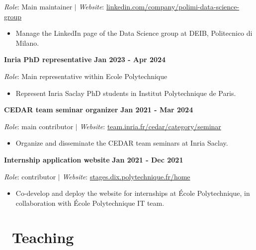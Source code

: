 \documentclass{article}
\begin{document}
\noindent\textit{Role}: Main maintainer $|$ \textit{Website}: \href{https://linkedin.com/company/polimi-data-science-group}{linkedin.com/company/polimi-data-science-group}

\begin{itemize}
\item Manage the LinkedIn page of the Data Science group at DEIB, Politecnico di Milano.
\end{itemize}
\vspace{1em}\noindent\textbf{Inria PhD representative} \hfill \textbf{Jan 2023 - Apr 2024}


\noindent\textit{Role}: Main representative within Ecole Polytechnique

\begin{itemize}
\item Represent Inria Saclay PhD students in Institut Polytechnique de Paris.
\end{itemize}
\vspace{1em}\noindent\textbf{CEDAR team seminar organizer} \hfill \textbf{Jan 2021 - Mar 2024}


\noindent\textit{Role}: main contributor $|$ \textit{Website}: \href{https://team.inria.fr/cedar/category/seminar}{team.inria.fr/cedar/category/seminar}

\begin{itemize}
\item Organize and disseminate the CEDAR team seminars at Inria Saclay.
\end{itemize}
\vspace{1em}\noindent\textbf{Internship application website} \hfill \textbf{Jan 2021 - Dec 2021}


\noindent\textit{Role}: contributor $|$ \textit{Website}: \href{https://stages.dix.polytechnique.fr/home}{stages.dix.polytechnique.fr/home}

\begin{itemize}
\item Co-develop and deploy the website for internships at École Polytechnique, in collaboration with École Polytechnique IT team.
\end{itemize}
\section*{\faSlideshare\ Teaching}
\end{document}
